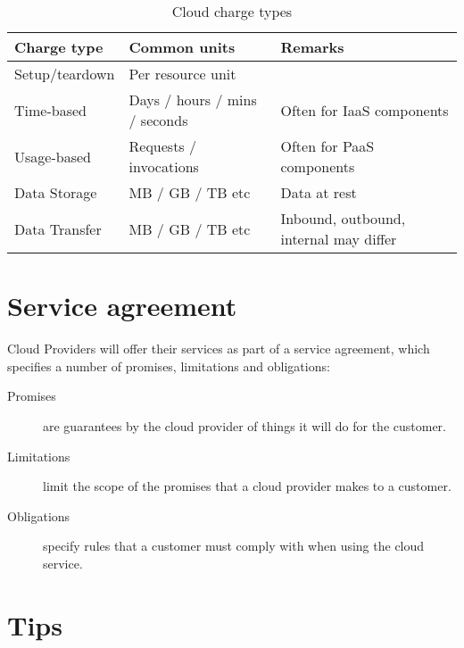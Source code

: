 \begin{table}
  \begin{tabularx}{1.0\linewidth}{l l X}
    \toprule
    \textbf{Charge type} & \textbf{Common units} & \textbf{Remarks}\\
    \midrule
    Setup/teardown & Per resource unit & ~ \\
    Time-based & Days / hours / mins / seconds & Often for IaaS components\\
    Usage-based & Requests / invocations & Often for PaaS components\\
    Data Storage & MB / GB / TB etc & Data at rest\\
    Data Transfer & MB / GB / TB etc & Inbound, outbound, internal may differ\\
    \bottomrule
  \end{tabularx}
  \caption{Cloud charge types}
  \label{tab:cloud-charge-types}
\end{table}


\section{Service agreement}\label{service-agreement}

Cloud Providers will offer their services as part of a service
agreement, which specifies a number of promises, limitations and
obligations:

\begin{description}
\item[Promises]
are guarantees by the cloud provider of things it will do for the
customer.
\item[Limitations]
limit the scope of the promises that a cloud provider makes to a
customer.
\item[Obligations]
specify rules that a customer must comply with when using the cloud
service.
\end{description}

\section{Tips}
\label{sec:tips}

